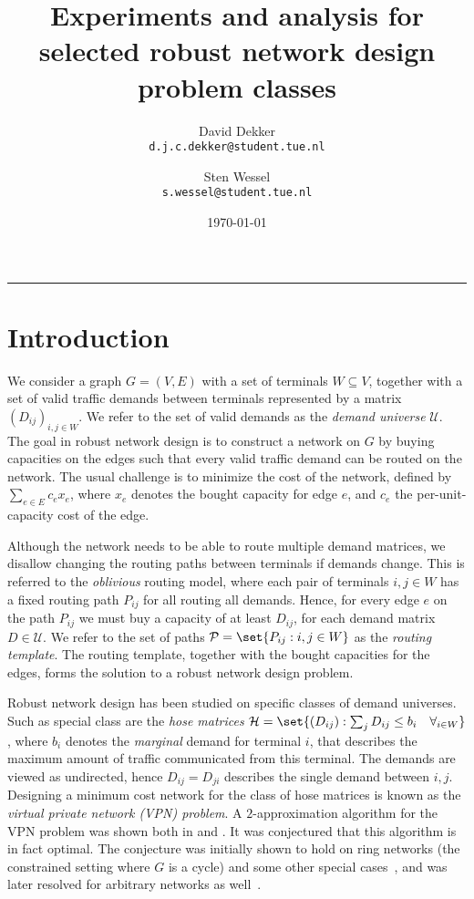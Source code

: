 \documentclass[11pt]{article}
\title{Experiments and analysis for selected robust network design problem classes}
\author{David Dekker \\ \texttt{d.j.c.dekker@student.tue.nl} \and Sten Wessel \\ \texttt{s.wessel@student.tue.nl}}
\date{\today}
\theoremstyle{definition}
\begin{document}
    \maketitle
    \hrule
    \bigskip

    \section{Introduction} \label{sec:introduction}
    We consider a graph $G = (V, E)$ with a set of terminals $W \subseteq V$, together with a set of valid traffic demands between terminals represented by a matrix $(D_{ij})_{i,j \in W}$.
    We refer to the set of valid demands as the \emph{demand universe} $\mathcal U$.
    The goal in robust network design is to construct a network on $G$ by buying capacities on the edges such that every valid traffic demand can be routed on the network.
    The usual challenge is to minimize the cost of the network, defined by $\sum_{e \in E} c_e x_e$, where $x_e$ denotes the bought capacity for edge $e$, and $c_e$ the per-unit-capacity cost of the edge.

    Although the network needs to be able to route multiple demand matrices, we disallow changing the routing paths between terminals if demands change.
    This is referred to the \emph{oblivious} routing model, where each pair of terminals $i,j \in W$ has a fixed routing path $P_{ij}$ for all routing all demands.
    Hence, for every edge $e$ on the path $P_{ij}$ we must buy a capacity of at least $D_{ij}$, for each demand matrix $D \in \mathcal U$.
    We refer to the set of paths $\mathcal P = \set{P_{ij} : i,j \in W}$ as the \emph{routing template}.
    The routing template, together with the bought capacities for the edges, forms the solution to a robust network design problem.

    Robust network design has been studied on specific classes of demand universes.
    Such as special class are the \emph{hose matrices} $\mathcal H = \set{(D_{ij}) : \sum_j D_{ij} \le b_i \quad \forall_{i \in W}}$, where $b_i$ denotes the \emph{marginal} demand for terminal $i$, that describes the maximum amount of traffic communicated from this terminal.
    The demands are viewed as undirected, hence $D_{ij} = D_{ji}$ describes the single demand between $i,j$.
    Designing a minimum cost network for the class of hose matrices is known as the \emph{virtual private network (VPN) problem}.
    A $2$-approximation algorithm for the VPN problem was shown both in \cite{fingerhut1997designing} and \cite{gupta2001provisioning}.
    It was conjectured \cite{italiano2006design} that this algorithm is in fact optimal.
    The conjecture was initially shown to hold on ring networks (the constrained setting where $G$ is a cycle) and some other special cases~\cite{hurkens2007virtual}, and was later resolved for arbitrary networks as well~\cite{goyal2013vpn}.
\end{document}
